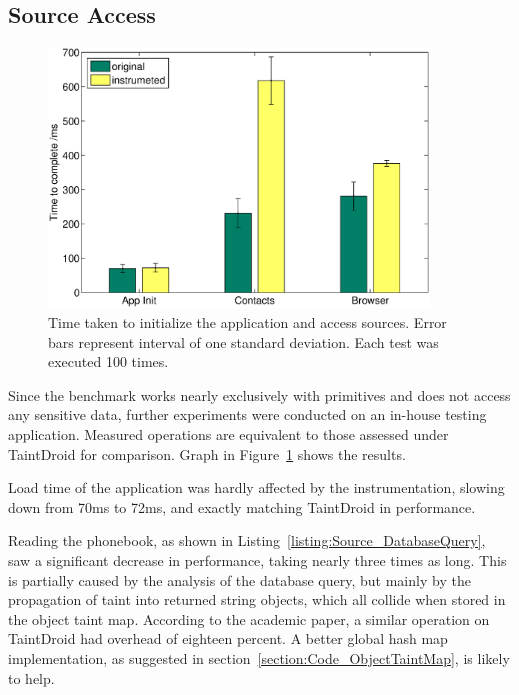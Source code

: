 \documentclass[12pt,twoside,notitlepage]{report}
\begin{document}
\subsection{Source Access}

\begin{figure}[t]
	\centerline{	
		\includegraphics[width=0.9\textwidth]{figs/fig_eval_testappbench.eps}
	}
	\caption{Time taken to initialize the application and access sources. Error bars represent interval of one standard deviation. Each test was executed 100 times.}
	\label{figure:Evalutaion_TestAppBench}
\end{figure}

Since the benchmark works nearly exclusively with primitives and does not access any sensitive data, further experiments were conducted on an in-house testing application. Measured operations are equivalent to those assessed under TaintDroid for comparison. Graph in Figure~\ref{figure:Evalutaion_TestAppBench} shows the results.

Load time of the application was hardly affected by the instrumentation, slowing down from 70ms to 72ms, and exactly matching TaintDroid in performance. 

Reading the phonebook, as shown in Listing~\ref{listing:Source_DatabaseQuery}, saw a significant decrease in performance, taking nearly three times as long. This is partially caused by the analysis of the database query, but mainly by the propagation of taint into returned string objects, which all collide when stored in the object taint map. According to the academic paper, a similar operation on TaintDroid had overhead of eighteen percent. A better global hash map implementation, as suggested in section~\ref{section:Code_ObjectTaintMap}, is likely to help.
\end{document}

